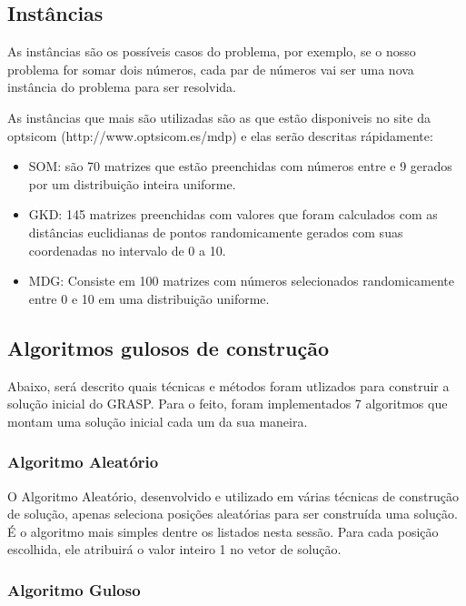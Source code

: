 \documentclass[12pt]{article}
\begin{document}
\subsection{Instâncias}

As instâncias são os possíveis casos do problema, por exemplo, se o nosso problema for somar dois números, cada par de números vai ser uma nova instância do problema para ser resolvida.

As instâncias que mais são utilizadas são as que estão disponiveis no site da optsicom (http://www.optsicom.es/mdp) e elas serão descritas rápidamente:

\begin{itemize}
    \item SOM: são 70 matrizes que estão preenchidas com números entre  e 9 gerados por um distribuição inteira uniforme.
    
    \item GKD: 145 matrizes preenchidas com valores que foram calculados com as distâncias euclidianas de pontos randomicamente gerados com suas coordenadas no intervalo de 0 a 10.
    
    \item MDG: Consiste em 100 matrizes com números selecionados randomicamente entre 0 e 10 em uma distribuição uniforme.
\end{itemize}


\subsection{Algoritmos gulosos de construção}

Abaixo, será descrito quais técnicas e métodos foram utlizados para construir a solução inicial do GRASP. Para o feito, foram implementados 7 algoritmos que montam uma solução inicial cada um da sua maneira.

\subsubsection{Algoritmo Aleatório}

O Algoritmo Aleatório, desenvolvido e utilizado em várias técnicas de construção de solução, apenas seleciona posições aleatórias para ser construída uma solução. É o algoritmo mais simples dentre os listados nesta sessão. Para cada posição escolhida, ele atribuirá o valor inteiro 1 no vetor de solução.

\subsubsection{Algoritmo Guloso}
\end{document}

